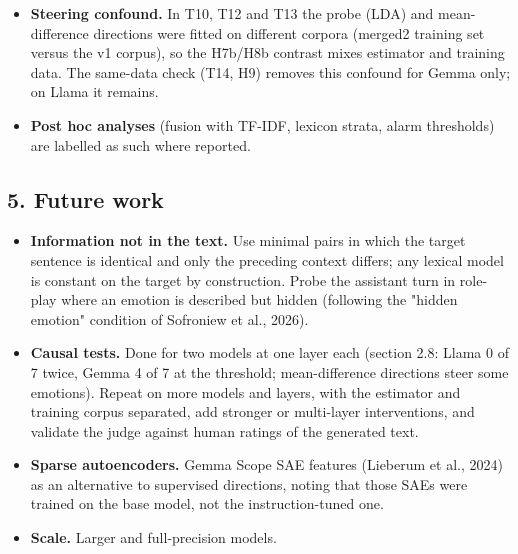 \documentclass[
  10pt,
]{article}
\providecommand{\tightlist}{%
  \setlength{\itemsep}{0pt}\setlength{\parskip}{0pt}}
\begin{document}
\begin{itemize}
  second judge (qwen3.8:27b) was Cohen\textquotesingle s kappa 0.642
  {[}0.582, 0.696{]} for Llama and 0.556 {[}0.499, 0.610{]} for Gemma
  (probe-steered strata 0.646 and 0.530). The pre-registered bar (kappa
  \textgreater= 0.60 overall and in the probe-steered strata of both
  models) was not met
  (\texttt{data/eval\_merged2/judge\_gen/judge\_gen.md}; viz\_plan T16).
  Agreement between the two models on clear synthetic emotional text is
  high (0.908), so the weakness is on ambiguous continuations. Agreement
  is not accuracy, and no human labels exist yet: every steering count
  above rests on this judge.
\item
  \textbf{Steering confound.} In T10, T12 and T13 the probe (LDA) and
  mean-difference directions were fitted on different corpora (merged2
  training set versus the v1 corpus), so the H7b/H8b contrast mixes
  estimator and training data. The same-data check (T14, H9) removes
  this confound for Gemma only; on Llama it remains.
\item
  \textbf{Post hoc analyses} (fusion with TF-IDF, lexicon strata, alarm
  thresholds) are labelled as such where reported.
\end{itemize}

\subsection{5. Future work}\label{5-future-work}

\begin{itemize}
\tightlist
\item
  \textbf{Information not in the text.} Use minimal pairs in which the
  target sentence is identical and only the preceding context differs;
  any lexical model is constant on the target by construction. Probe the
  assistant turn in role-play where an emotion is described but hidden
  (following the "hidden emotion" condition of Sofroniew et al., 2026).
\item
  \textbf{Causal tests.} Done for two models at one layer each (section
  2.8: Llama 0 of 7 twice, Gemma 4 of 7 at the threshold;
  mean-difference directions steer some emotions). Repeat on more models
  and layers, with the estimator and training corpus separated, add
  stronger or multi-layer interventions, and validate the judge against
  human ratings of the generated text.
\item
  \textbf{Sparse autoencoders.} Gemma Scope SAE features (Lieberum et
  al., 2024) as an alternative to supervised directions, noting that
  those SAEs were trained on the base model, not the instruction-tuned
  one.
\item
  \textbf{Scale.} Larger and full-precision models.
\end{itemize}
\end{document}
